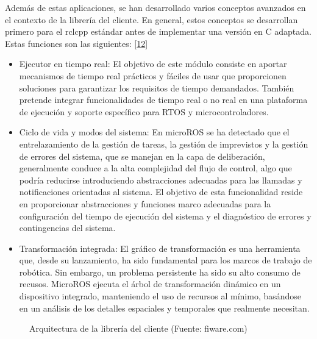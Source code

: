 \documentclass[a4paper,11pt,spanish]{sphinxmanual}
\let\sphinxpxdimen\pdfpxdimen\else\newdimen\sphinxpxdimen
\begin{document}
\sphinxAtStartPar
Además de estas aplicaciones, se han desarrollado varios conceptos
avanzados en el contexto de la librería del cliente. En general, estos
conceptos se desarrollan primero para el rclcpp estándar antes de
implementar una versión en C adaptada. Estas funciones son las
siguientes: {[}\hyperlink{cite.marco_teorico_y_estado_del_arte:id20}{12}{]}
\begin{itemize}
\item {} 
\sphinxAtStartPar
Ejecutor en tiempo real: El objetivo de este módulo consiste en
aportar mecanismos de tiempo real prácticos y fáciles de usar que
proporcionen soluciones para garantizar los requisitos de tiempo
demandados. También pretende integrar funcionalidades de tiempo real
o no real en una plataforma de ejecución y soporte específico para
RTOS y microcontroladores.

\item {} 
\sphinxAtStartPar
Ciclo de vida y modos del sistema: En micro\sphinxhyphen{}ROS se ha detectado que
el entrelazamiento de la gestión de tareas, la gestión de imprevistos
y la gestión de errores del sistema, que se manejan en la capa de
deliberación, generalmente conduce a la alta complejidad del flujo de
control, algo que podría reducirse introduciendo abstracciones
adecuadas para las llamadas y notificaciones orientadas al sistema.
El objetivo de esta funcionalidad reside en proporcionar
abstracciones y funciones marco adecuadas para la configuración del
tiempo de ejecución del sistema y el diagnóstico de errores y
contingencias del sistema.

\item {} 
\sphinxAtStartPar
Transformación integrada: El gráfico de transformación es una
herramienta que, desde su lanzamiento, ha sido fundamental para los
marcos de trabajo de robótica. Sin embargo, un problema persistente
ha sido su alto consumo de recusos. Micro\sphinxhyphen{}ROS ejecuta el árbol de
transformación dinámico en un dispositivo integrado, manteniendo el
uso de recursos al mínimo, basándose en un análisis de los detalles
espaciales y temporales que realmente necesitan.

\end{itemize}

\begin{figure}[htbp]
\centering
\capstart

\noindent\sphinxincludegraphics[width=500\sphinxpxdimen]{{micro-ROS_client_library}.png}
\caption{Arquitectura de la librería del cliente (Fuente: fiware.com)}\label{\detokenize{software:id25}}\end{figure}
\end{document}
